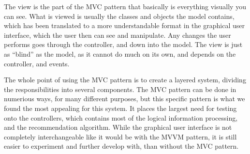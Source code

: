 The view is the part of the MVC pattern that basically is everything visually you can see. What is viewed is usually the classes and objects the model contains, which has been translated to a more understandable format in the graphical user interface, which the user then can see and manipulate. Any changes the user performs goes through the controller, and down into the model. The view is just as “blind” as the model, as it cannot do much on its own, and depends on the controller, and events.

The whole point of using the MVC pattern is to create a layered system, dividing the responsibilities into several components. The MVC pattern can be done in numerious ways, for many different purposes, but this specific pattern is what we found the most appealing for this system. It places the largest need for testing onto the controllers, which contains most of the logical information processing, and the recommendation algorithm. While the graphical user interface is not completely interchangeable like it would be with the MVVM pattern, it is still easier to experiment and further develop with, than without the MVC pattern.
